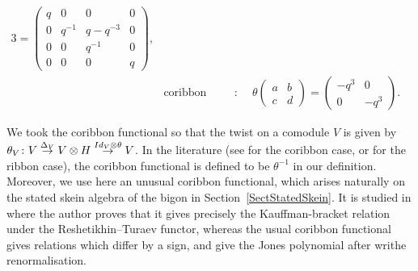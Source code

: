 \documentclass[11pt]{article}
\numberwithin{equation}{section}
\numberwithin{equation}{section}
\begin{document}
\begin{Definition}
\begin{alignat*}{3}
=\begin{pmatrix} q& 0 & 0 & 0\\ 0 & q^{-1} & q-q^{-3} & 0\\ 0 & 0 & q^{-1}&0\\ 0 & 0 & 0 & q \end{pmatrix}\!,&
\\
& \text{coribbon functional}\colon \quad && \theta \begin{pmatrix} a & b \\[-.5ex] c & d \end{pmatrix}
= \begin{pmatrix} -q^3 & 0 \\[-.5ex] 0 & -q^3 \end{pmatrix}\!.&
\end{alignat*}
\end{Definition}

\begin{Remark}
We took the coribbon functional so that the twist on a comodule $V$ is given by $\theta_V\colon V \overset{\Delta_V}{\to} V \otimes H \overset{{\rm Id}_V \otimes \theta}{\to} V$. In the literature (see \cite{Wakui} for the coribbon case, or \cite{Kassel} for the ribbon case), the coribbon functional is defined to be $\theta^{-1}$ in our definition.
Moreover, we use here an unusual coribbon functional, which arises naturally on the stated skein algebra of the bigon in Section~\ref{SectStatedSkein}. It is studied in \cite{Tingley} where the author proves that it gives precisely the Kauffman-bracket relation under the Reshetikhin--Turaev functor, whereas the usual coribbon functional gives relations which differ by a sign, and give the Jones polynomial after writhe renormalisation.
\end{Remark}
\end{document}

